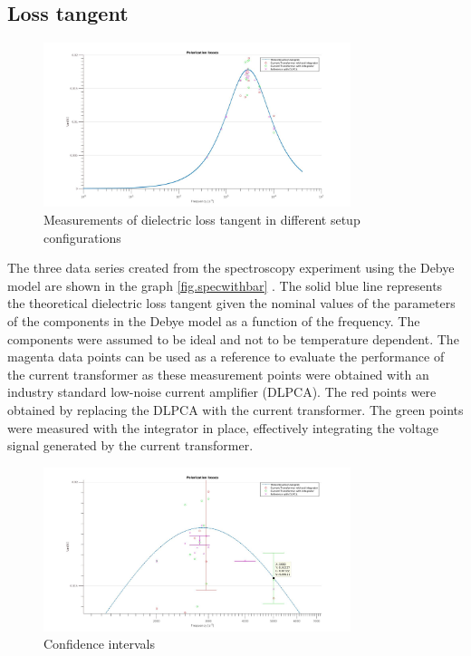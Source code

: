 \subsection{Loss tangent}
\begin{figure}[htbp]
  \centering
  \centerline{\includegraphics[width=0.8\textwidth]{figures/Results/Spectroscopy/spectroscopywithoutbars}}
  \caption[Kurze Abbildungsbeschreibung]{Measurements of dielectric loss tangent in different setup configurations}
\label{fig.specwithbar}
  \label{fig.spectroscopy}

\end{figure}
The three data series created from the spectroscopy experiment using the Debye model are shown in the graph \ref{fig.specwithbar} . The solid blue line represents the theoretical  dielectric loss tangent given the nominal values of the parameters of the components in the Debye model
as a function of the frequency.
The components were assumed to be ideal and not to be temperature dependent.
The magenta data points can be used as a reference to evaluate the performance of the current transformer as these measurement points
were obtained with an industry standard low-noise current amplifier (DLPCA). 
The red points were obtained by replacing the DLPCA with the current transformer.
The green points were measured with the integrator in place, effectively integrating the voltage signal generated by the current transformer.

\begin{figure}[htbp]
 \centering
 \centerline{\includegraphics[width=0.8\textwidth]{figures/Results/Spectroscopy/errorbarsbettercolor}}

\caption[Kurze Abbildungsbeschreibung]{Confidence intervals}
\label{fig.spectroscopy2}
\end{figure}

